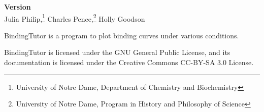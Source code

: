 \thispagestyle{empty}
\noindent{}

\begin{center}
	\Large \sffamily
	\vspace{0.5in} \par \textbf{Version \mtbversion} \\[1.5em]
	
	Julia Philip,\footnote{University of Notre Dame, Department of Chemistry and Biochemistry}
	Charles Pence,\footnote{University of Notre Dame, Program in History and Philosophy of Science}
	Holly Goodson\footnotemark[1]
	\vspace{1in}
\end{center} \par

BindingTutor is a program to plot binding curves under various conditions.

BindingTutor is licensed under the GNU General Public License, and its documentation is licensed under the Creative Commons CC-BY-SA 3.0 License.
